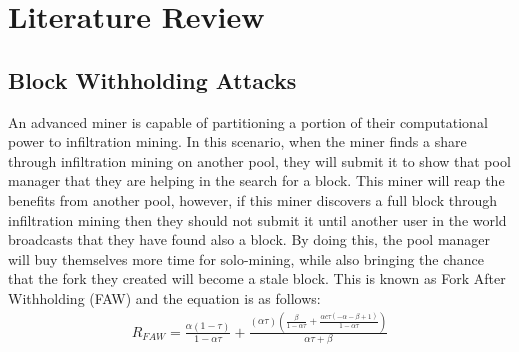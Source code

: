 \documentclass[runningheads]{llncs}
\begin{document}



\section{Literature Review}
\subsection{Block Withholding Attacks}
An advanced miner is capable of partitioning a portion of their computational power to infiltration mining. In this scenario, when the miner finds a share through infiltration mining on another pool, they will submit it to show that pool manager that they are helping in the search for a block. This miner will reap the benefits from another pool, however, if this miner discovers a full block through infiltration mining then they should not submit it until another user in the world broadcasts that they have found also a block. By doing this, the pool manager will buy themselves more time for solo-mining, while also bringing the chance that the fork they created will become a stale block. This is known as Fork After Withholding (FAW) and the equation is as follows:
\begin{eqnarray}
R_{FAW}=\frac{\alpha  (1-\tau )}{1-\alpha  \tau }+\frac{(\alpha  \tau ) \left(\frac{\beta }{1-\alpha  \tau }+\frac{\alpha  c \tau  (-\alpha -\beta +1)}{1-\alpha  \tau }\right)}{\alpha  \tau +\beta }
\end{eqnarray}
\end{document}
